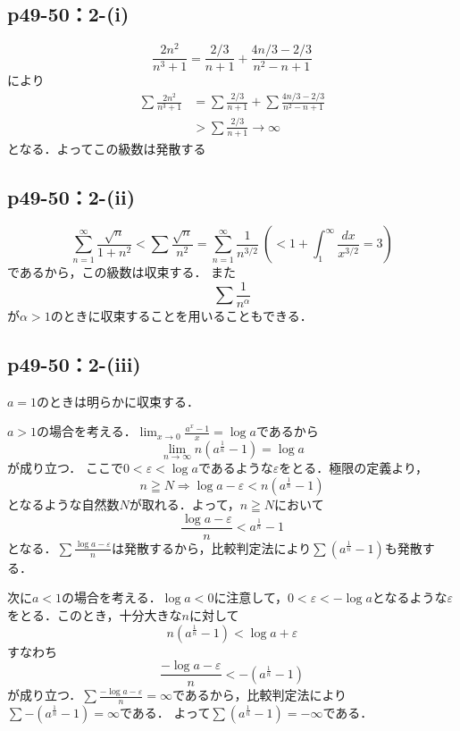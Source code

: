 \documentclass[a4paper,10pt,fleqn]{ltjsarticle}
\begin{document}
\subsection*{p49-50：2-(i)}

\begin{screen}
	\[
	\frac{2n^2}{n^3+1}=\frac{2/3}{n+1}+\frac{4n/3-2/3}{n^2-n+1}
	\]
	により
	\begin{align*}
	\sum \frac{2n^2}{n^3+1}&=\sum \frac{2/3}{n+1}+\sum \frac{4n/3-2/3}{n^2-n+1} \\
	&>\sum \frac{2/3}{n+1} \rightarrow \infty
	\end{align*}
	となる．よってこの級数は発散する
	\end{screen}
	

    \subsection*{p49-50：2-(ii)}

	\begin{screen}
	\[
	\sum ^{\infty}_{n=1}\frac{\sqrt{n}}{1+n^2}<\sum \frac{\sqrt{n}}{n^2}=\sum^{\infty}_{n=1}\frac{1}{n^{3/2}}~\left(<1+\int^{\infty}_{1}\frac{dx}{x^{3/2}}=3\right)
	\]
    であるから，この級数は収束する．
	また
	\[
	\sum \frac{1}{n^\alpha}
	\]
	が$\alpha >1$のときに収束することを用いることもできる．
	\end{screen}


    \subsection*{p49-50：2-(iii)}

	\begin{screen}
        $a=1$のときは明らかに収束する．
  
        $a>1$の場合を考える．$\lim_{x \to 0} \frac{a^x-1}{x} = \log a$であるから
        \[
        \lim_{n \to \infty} n(a^{\frac{1}{n}}-1) = \log a
        \]
        が成り立つ．
        ここで$0 < \varepsilon <\log a$であるような$\varepsilon$をとる．極限の定義より，
        \[
         n \geqq N \Longrightarrow \log a - \varepsilon < n (a^\frac{1}{n}-1)
        \]
        となるような自然数$N$が取れる．よって，$n \geqq N$において
        \[
            \frac{\log a - \varepsilon}{n} < a^\frac{1}{n}-1
        \]
        となる．$\sum \frac{\log a - \varepsilon}{n}$は発散するから，比較判定法により$\sum (a^{\frac{1}{n}}-1)$も発散する．

        次に$ a<1$の場合を考える．$\log a <0$に注意して，$0 < \varepsilon <-\log a $となるような$\varepsilon$をとる．このとき，十分大きな$n$に対して
        \[
        n (a^\frac{1}{n}-1) < \log a + \varepsilon
        \]
        すなわち
        \[
        \frac{-\log a - \varepsilon}{n} < -(a^\frac{1}{n}-1)
        \]
        が成り立つ．$\sum \frac{-\log a - \varepsilon}{n}=\infty$であるから，比較判定法により$\sum -(a^{\frac{1}{n}}-1)=\infty$である．
        よって$\sum (a^{\frac{1}{n}}-1)=-\infty$である．
	\end{screen}
\end{document}
